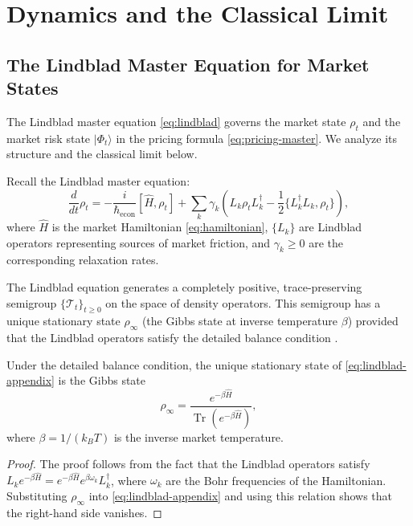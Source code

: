 
\section{Dynamics and the Classical Limit}\label{app:classical-limit}

\subsection{The Lindblad Master Equation for Market States}

The Lindblad master equation \eqref{eq:lindblad} governs the market state
$\rho_t$ and the market risk state $|\Phi_t\rangle$ in the pricing formula
\eqref{eq:pricing-master}. We analyze its structure and the classical limit
below.

Recall the Lindblad master equation:
\begin{equation}\label{eq:lindblad-appendix}
    \frac{d}{dt} \rho_t = -\frac{i}{\hbar_{\mathrm{econ}}} [\hat{H}, \rho_t]
    + \sum_k \gamma_k
    \left( L_k \rho_t L_k^\dagger - \frac{1}{2} \{L_k^\dagger L_k, \rho_t\} \right),
\end{equation}
where $\hat{H}$ is the market Hamiltonian \eqref{eq:hamiltonian}, $\{L_k\}$ are
Lindblad operators representing sources of market friction, and $\gamma_k \geq 0$
are the corresponding relaxation rates.

The Lindblad equation generates a completely positive, trace-preserving semigroup
$\{\mathcal{T}_t\}_{t \geq 0}$ on the space of density operators. This semigroup
has a unique stationary state $\rho_\infty$ (the Gibbs state at inverse
temperature $\beta$) provided that the Lindblad operators satisfy the detailed
balance condition \citep{breuer2007theory}.

\begin{proposition}\label{prop:stationary-state}
Under the detailed balance condition, the unique stationary state of
\eqref{eq:lindblad-appendix} is the Gibbs state
\begin{equation*}
    \rho_\infty = \frac{e^{-\beta \hat{H}}}{\operatorname{Tr}(e^{-\beta \hat{H}})},
\end{equation*}
where $\beta = 1/(k_B T)$ is the inverse market temperature.
\end{proposition}

\begin{proof}
The proof follows from the fact that the Lindblad operators satisfy
$L_k e^{-\beta \hat{H}} = e^{-\beta \hat{H}} e^{\beta \omega_k} L_k^\dagger$,
where $\omega_k$ are the Bohr frequencies of the Hamiltonian. Substituting
$\rho_\infty$ into \eqref{eq:lindblad-appendix} and using this relation shows
that the right-hand side vanishes.
\end{proof}


